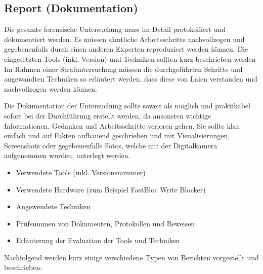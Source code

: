 \subsection{Report (Dokumentation)}
Die gesamte forensische Untersuchung muss im Detail protokolliert und dokumentiert werden. Es müssen sämtliche Arbeitsschritte nachvollzogen und gegebenenfalls durch einen anderen Experten reproduziert werden können. Die eingesetzten Tools (inkl. Version) und Techniken sollten kurz beschrieben werden Im Rahmen einer Strafuntersuchung müssen die durchgeführten Schritte und angewandten Techniken so erläutert werden, dass diese von Laien verstanden und nachvollzogen werden können.

Die Dokumentation der Untersuchung sollte soweit als möglich und praktikabel sofort bei der Durchführung erstellt werden, da ansonsten wichtige Informationen, Gedanken und Arbeitsschritte verloren gehen. Sie sollte klar, einfach und auf Fakten aufbauend geschrieben und mit Visualisierungen, Screenshots oder gegebenenfalls Fotos, welche mit der Digitalkamera aufgenommen wurden, unterlegt werden. 

\begin{itemize}
\item Verwendete Tools (inkl. Versionsnummer)
\item Verwendete Hardware (zum Beispiel FastBloc Write Blocker)
\item Angewendete Techniken
\item Prüfsummen von Dokumenten, Protokollen und Beweisen
\item Erläuterung der Evaluation der Tools und Techniken
\end{itemize}

Nachfolgend werden kurz einige verschiedene Typen von Berichten vorgestellt und beschrieben:

